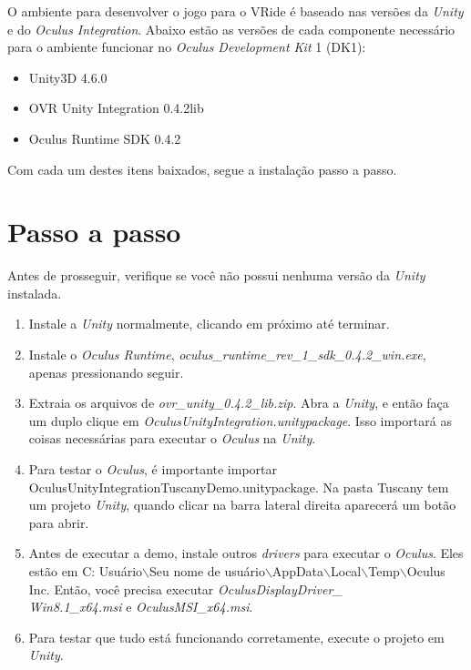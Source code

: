 O ambiente para desenvolver o jogo para o VRide é baseado nas versões da \textit{Unity} e do \textit{Oculus Integration}. Abaixo estão as versões de cada componente necessário para o ambiente funcionar no \textit{Oculus Development Kit} 1 (DK1):

\begin{itemize}
\item Unity3D 4.6.0
\item OVR Unity Integration 0.4.2lib
\item Oculus Runtime SDK 0.4.2
\end{itemize}

Com cada um destes itens baixados, segue a instalação passo a passo.

\section{Passo a passo}

Antes de prosseguir, verifique se você não possui nenhuma versão da \textit{Unity} instalada.

\begin{enumerate}
\item Instale a \textit{Unity} normalmente, clicando em próximo até terminar.

\item Instale o \textit{Oculus Runtime}, \textit{oculus\_runtime\_rev\_1\_sdk\_0.4.2\_win.exe}, apenas pressionando seguir.

\item Extraia os arquivos de \textit{ovr\_unity\_0.4.2\_lib.zip}. Abra a \textit{Unity}, e então faça um duplo clique em \textit{OculusUnityIntegration.unitypackage}. Isso importará as coisas necessárias para executar o \textit{Oculus} na \textit{Unity}.

\item Para testar o \textit{Oculus}, é importante importar OculusUnityIntegrationTuscanyDemo.unitypackage. Na pasta Tuscany tem um projeto \textit{Unity}, quando clicar na barra lateral direita aparecerá um botão para abrir.

\item Antes de executar a demo, instale outros \textit{drivers} para executar o \textit{Oculus}. Eles estão em C: Usuário$\backslash$Seu nome de usuário$\backslash$AppData$\backslash$Local$\backslash$Temp$\backslash$Oculus Inc. Então, você precisa executar \textit{OculusDisplayDriver\_\\Win8.1\_x64.msi} e \textit{OculusMSI\_x64.msi}.

\item Para testar que tudo está funcionando corretamente, execute o projeto em \textit{Unity}.
\end{enumerate}
